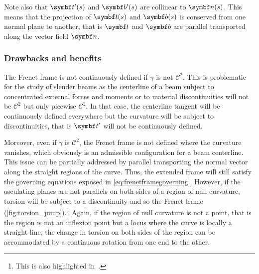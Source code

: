 Note also that $\vect{t}'(s)$ and $\vect{b}'(s)$ are collinear to $\vect{n}(s)$. This means that the projection of $\vect{t}(s)$ and $\vect{b}(s)$ is conserved from one normal plane to another, that is $\vect{t}$ and $\vect{b}$ are parallel transported along the vector field $\vect{n}$.

\subsubsection{Drawbacks and benefits}\label{sec=frenetdrawbacks}

The Frenet frame is not continuously defined if $\gamma$ is not $\mathcal{C}^2$. This is problematic for the study of slender beams as the centerline of a beam subject to concentrated external forces and moments or to material discontinuities will not be $\mathcal{C}^2$ but only picewise $\mathcal{C}^2$. In that case, the centerline tangent will be continuously defined everywhere but the curvature will be subject to discontinuities, that is $\vect{t}'$ will not be continuously defined.

Moreover, even if $\gamma$ is $\mathcal{C}^2$, the Frenet frame is not defined where the curvature vanishes, which obviously is an admissible configuration for a beam centerline. This issue can be partially addressed by parallel transporting the normal vector along the straight regions of the curve. Thus, the extended frame will still satisfy the governing equations exposed in \cref{eq:frenetframegoverning}. However, if the osculating planes are not parallels on both sides of a region of null curvature, torsion will be subject to a discontinuity and so the Frenet frame (\cref{fig:torsion_jump}).\footnote{This is also highlighted in~\cite{Bloomenthal1990, Wang2008}.} Again, if the region of null curvature is not a point, that is the region is not an inflexion point but a locus where the curve is locally a straight line, the change in torsion on both sides of the region can be accommodated by a continuous rotation from one end to the other.

